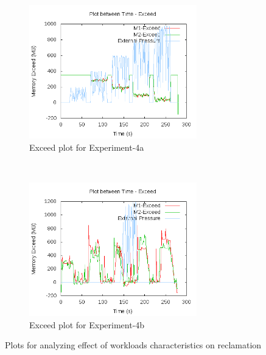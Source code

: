 	  \begin{figure}[t!]
	    \centering
	    \begin{subfigure}[t]{0.48\textwidth}
	      \centering
	      \includegraphics[width=0.8\textwidth]{images/controller_issues/workload/1/Exceed.png}
	      \caption{Exceed plot for Experiment-4a}
	      \label{img:workload_1_exceed}
	    \end{subfigure}
	    ~ 
	    \begin{subfigure}[t]{0.48\textwidth}
	      \centering
	      \includegraphics[width=0.8\textwidth]{images/controller_issues/workload/2/Exceed.png}
	      \caption{Exceed plot for Experiment-4b}
	      \label{img:workload_2_exceed}
	    \end{subfigure}
	    \caption{Plots for analyzing effect of workloads characteristics on reclamation}
	  \end{figure}		
	    
